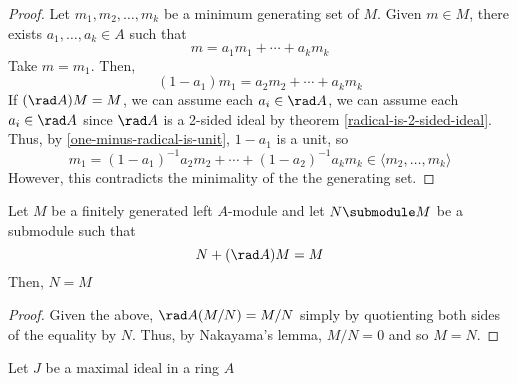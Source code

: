 \documentclass[11pt,leqno,oneside]{amsbook}
\numberwithin{thm}{section}
\begin{document}
\begin{proof}
  Let \(m_1, m_2, \ldots, m_k\) be a minimum generating set of
  \(M\). Given \(m \in M\), there exists \(a_1, \ldots, a_k \in A\)
  such that \[
    m = a_1 m_1 + \cdots + a_k m_k
  \]
  Take \(m = m_1\). Then, \[
    (1-a_1)m_1 = a_2 m_2 + \cdots + a_k m_k
  \]
  If \((\rad A) M = M\), we can assume each \(a_i \in \rad A\), we can
  assume each \(a_i \in \rad A\) since \(\rad A\) is a 2-sided ideal
  by theorem \ref{radical-is-2-sided-ideal}. Thus, by
  \ref{one-minus-radical-is-unit}, \(1-a_1\) is a unit, so \[
    m_1 = (1-a_1)^{-1} a_2 m_2 + \cdots + (1-a_2)^{-1} a_k m_k \in
    \langle m_2, \ldots, m_k \rangle
  \]
  However, this contradicts the minimality of the the generating set.
\end{proof}
\begin{cor}
  Let \(M\) be a finitely generated left \(A\)-module and let \(N
  \submodule M\) be a submodule such that \[
    N+(\rad A)M = M
  \]
  Then, \(N = M\)
\end{cor}
\begin{proof}
  Given the above, \(\rad A(M/N) = M/N\) simply by quotienting both
  sides of the equality by \(N\). Thus, by Nakayama's lemma, \(M/N =
  0\) and so \(M=N\).
\end{proof}
\begin{cor}
  Let \(J\) be a maximal ideal in a ring \(A\)
\end{cor}
\end{document}

